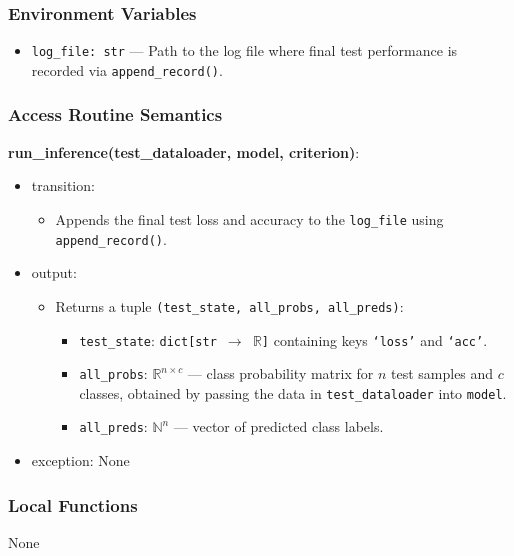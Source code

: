 \documentclass[12pt, titlepage]{article}
\begin{document}
\subsubsection{Environment Variables}
\begin{itemize}
  \item \texttt{log\_file: str} — Path to the log file where final test performance is recorded via \texttt{append\_record()}.
\end{itemize}

\subsubsection{Access Routine Semantics}

\noindent \textbf{run\_inference(test\_dataloader, model, criterion)}:
\begin{itemize}
  \item transition:
  \begin{itemize}
    \item Appends the final test loss and accuracy to the \texttt{log\_file} using \texttt{append\_record()}.
  \end{itemize}
  \item output:
  \begin{itemize}
    \item Returns a tuple \texttt{(test\_state, all\_probs, all\_preds)}:
    \begin{itemize}
      \item \texttt{test\_state}: \texttt{dict[str $\rightarrow$ \(\mathbb{R}\)]} containing keys \texttt{`loss'} and \texttt{`acc'}.
      \item \texttt{all\_probs}: \(\mathbb{R}^{n \times c}\) — class probability matrix for \(n\) test samples and \(c\) classes, obtained by passing the data in \texttt{test\_dataloader} into \texttt{model}.
      \item \texttt{all\_preds}: \(\mathbb{N}^n\) — vector of predicted class labels.
    \end{itemize}
  \end{itemize}
  \item exception: None
\end{itemize}

\subsubsection{Local Functions}
None
\end{document}
